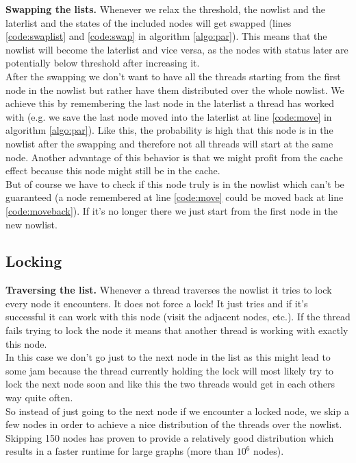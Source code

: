 \documentclass[letterpaper]{article}
\newcommand{\mypar}[1]{{\bf #1.}}
\begin{document}
\mypar{Swapping the lists}
Whenever we relax the threshold, the nowlist and the laterlist and the states of the included nodes will get swapped (lines \ref{code:swaplist} and \ref{code:swap} in algorithm \ref{algo:par}). This means that the nowlist will become the laterlist and vice versa, as the nodes with status later are potentially below threshold after increasing it.\\
After the swapping we don't want to have all the threads starting from the first node in the nowlist but rather have them distributed over the whole nowlist. We achieve this by remembering the last node in the laterlist a thread has worked with (e.g. we save the last node moved into the laterlist at line \ref{code:move} in algorithm \ref{algo:par}). Like this, the probability is high that this node is in the nowlist after the swapping and therefore not all threads will start at the same node. Another advantage of this behavior is that we might profit from the cache effect because this node might still be in the cache.\\
But of course we have to check if this node truly is in the nowlist which can't be guaranteed (a node remembered at line \ref{code:move} could be moved back at line \ref{code:moveback}). If it's no longer there we just start from the first node in the new nowlist.

\subsection{Locking}\label{ssec:lock}

\mypar{Traversing the list}
Whenever a thread traverses the nowlist it tries to lock every node it encounters. It does not force a lock! It just tries and if it's successful it can work with this node (visit the adjacent nodes, etc.). If the thread fails trying to lock the node it means that another thread is working with exactly this node.\\
In this case we don't go just to the next node in the list as this might lead to some jam because the thread currently holding the lock will most likely try to lock the next node soon and like this the two threads would get in each others way quite often.\\
So instead of just going to the next node if we encounter a locked node, we skip a few nodes in order to achieve a nice distribution of the threads over the nowlist. Skipping 150 nodes has proven to provide a relatively good distribution which results in a faster runtime for large graphs (more than $10^6$ nodes).
\end{document}

